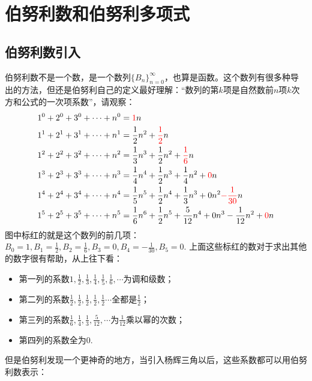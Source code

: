 \documentclass[main.tex]{subfiles}
\begin{document}
\section{伯努利数和伯努利多项式}

\subsection{伯努利数引入}

伯努利数不是一个数，是一个数列\(\{B_n\}_{n=0}^{\infty}\)，也算是函数。这个数列有很多种导出的方法，但还是伯努利自己的定义最好理解：“数列的第\(k\)项是自然数前\(n\)项\(k\)次方和公式的一次项系数”，请观察：
\begin{align*}
    1^0+2^0+3^0+ \cdots +n^0 &= {\color{red} 1}n \\
    1^1+2^1+3^1+ \cdots +n^1 &= \frac{1}{2}n^2+{\color{red} \frac{1}{2}}n \\
    1^2+2^2+3^2+ \cdots +n^2 &= \frac{1}{3}n^3+\frac{1}{2}n^2+{\color{red} \frac{1}{6}}n \\
    1^3+2^3+3^3+ \cdots +n^3 &= \frac{1}{4}n^4+\frac{1}{2}n^3+\frac{1}{4}n^2+{\color{red} 0}n \\
    1^4+2^4+3^4+ \cdots +n^4 &= \frac{1}{5}n^5+\frac{1}{2}n^4+\frac{1}{3}n^3+0n^2{\color{red} -\frac{1}{30}}n \\
    1^5+2^5+3^5+ \cdots +n^5 &= \frac{1}{6}n^6+\frac{1}{2}n^5+\frac{5}{12}n^4+0n^3-\frac{1}{12}n^2+{\color{red} 0}n
\end{align*}
图中标红的就是这个数列的前几项：\(\displaystyle{B_0=1, B_1=\frac{1}{2}, B_2=\frac{1}{6}, B_3=0, B_4=-\frac{1}{30}, B_5=0}\). 上面这些标红的数对于求出其他的数字很有帮助，从上往下看：
\begin{itemize}
    \item [] 第一列的系数\(\displaystyle{1, \frac{1}{2}, \frac{1}{3}, \frac{1}{4}, \frac{1}{5}, \frac 1 6, \cdots}\)为调和级数；
    \item [] 第二列的系数\(\displaystyle{\frac{1}{2}, \frac{1}{2}, \frac{1}{2}, \frac{1}{2}, \frac 1 2 \cdots}\)全都是\(\displaystyle{\frac{1}{2}}\)；
    \item [] 第三列的系数\(\displaystyle{\frac 1 6, \frac 1 4, \frac 1 3, \frac{5}{12}, \cdots}\)为\(\displaystyle{\frac{1}{12}}\)乘以幂的次数；
    \item [] 第四列的系数全为\(0\).
\end{itemize}
但是伯努利发现一个更神奇的地方，当引入杨辉三角以后，这些系数都可以用伯努利数表示：
\end{document}
